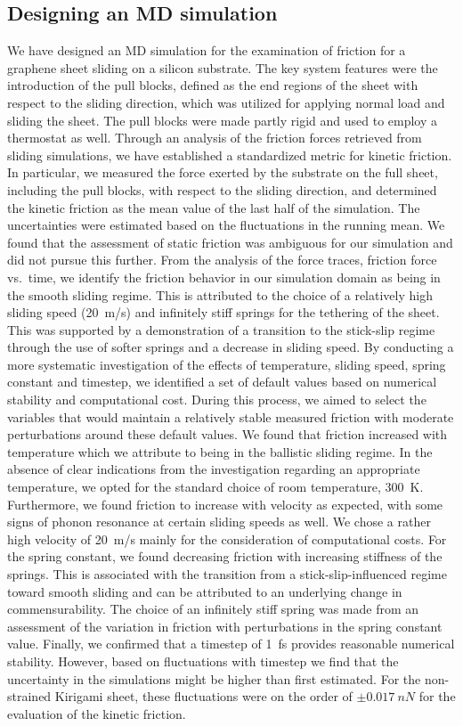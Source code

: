 \subsection{Designing an MD simulation}
We have designed an \acrshort{MD} simulation for the examination of friction for
a graphene sheet sliding on a silicon substrate. The key system features were
the introduction of the pull blocks, defined as the end regions of the sheet
with respect to the sliding direction, which was utilized for applying normal
load and sliding the sheet. The pull blocks were made partly rigid and used to
employ a thermostat as well. Through an analysis of the friction forces retrieved from sliding simulations, we have established a standardized metric for kinetic friction. In particular, we measured the force exerted by the substrate on the full sheet, including the pull blocks, with respect to the sliding direction, and determined the kinetic friction as the mean value of the last half of the simulation. The uncertainties were estimated based on the fluctuations in the running mean. We found that the assessment of static friction was ambiguous for our simulation and did not pursue this further. From the analysis of the
force traces, friction force vs.\ time, we identify the friction behavior in our
simulation domain as being in the smooth sliding regime. This is attributed to the choice of a relatively high sliding speed (\SI{20}{m/s}) and infinitely stiff springs for the tethering of the sheet. This was supported by a demonstration of a transition to the stick-slip regime through the use of softer springs and a decrease in sliding speed. By conducting a more systematic investigation of the
effects of temperature, sliding speed, spring constant and timestep, we identified a set of default values based on numerical stability and computational cost. During this process, we aimed to select the variables that would maintain a relatively stable measured friction with moderate perturbations around these default values.
We found that friction increased with temperature which we attribute to being in
the ballistic sliding regime. In the absence of clear indications from the investigation regarding an appropriate temperature, we opted for the standard choice of room temperature, \SI{300}{K}. Furthermore, we found friction to increase with velocity as
expected, with some signs of phonon resonance at certain sliding speeds as well.
We chose a rather high velocity of \SI{20}{m/s} mainly for the consideration of
computational costs. For the spring constant, we found decreasing friction with
increasing stiffness of the springs. This is associated with the transition from
a stick-slip-influenced regime toward smooth sliding and can be attributed to an underlying change in commensurability. The choice of an
infinitely stiff spring was made from an assessment of the variation in friction with perturbations in the spring constant value. Finally, we
confirmed that a timestep of \SI{1}{fs} provides reasonable numerical stability.
However, based on fluctuations with timestep we find that the uncertainty in the
simulations might be higher than first estimated. For the non-strained Kirigami sheet, these fluctuations were on the order of $\pm \SI{0.017}{nN}$ for the evaluation of the kinetic friction.


